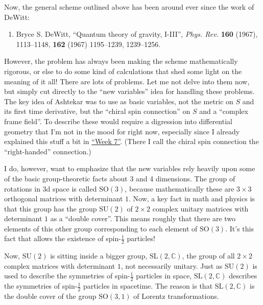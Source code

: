 \documentclass{article}
\def\tightlist{}
\begin{document}
Now, the general scheme outlined above has been around ever since the
work of DeWitt:

\begin{enumerate}
\def\labelenumi{\arabic{enumi})}
\tightlist
\item
  Bryce S. DeWitt, ``Quantum theory of gravity, I-III'', \emph{Phys.
  Rev.} \textbf{160} (1967), 1113--1148, \textbf{162} (1967) 1195--1239,
  1239--1256.
\end{enumerate}

However, the problem has always been making the scheme mathematically
rigorous, or else to do some kind of calculations that shed some light
on the meaning of it all! There are lots of problems. Let me not delve
into them now, but simply cut directly to the ``new variables'' idea for
handling these problems. The key idea of Ashtekar was to use as basic
variables, not the metric on \(S\) and its first time derivative, but
the ``chiral spin connection'' on \(S\) and a ``complex frame field''.
To describe these would require a digression into differential geometry
that I'm not in the mood for right now, especially since I already
explained this stuff a bit in \protect\hyperlink{week7}{``Week 7''}.
(There I call the chiral spin connection the ``right-handed''
connection.)

I do, however, want to emphasize that the new variables rely heavily
upon some of the basic group-theoretic facts about 3 and 4 dimensions.
The group of rotations in 3d space is called \(\mathrm{SO}(3)\), because
mathematically these are \(3\times3\) orthogonal matrices with
determinant \(1\). Now, a key fact in math and physics is that this
group has the group \(\mathrm{SU}(2)\) of \(2\times2\) complex unitary
matrices with determinant \(1\) as a ``double cover''. This means
roughly that there are two elements of this other group corresponding to
each element of \(\mathrm{SO}(3)\). It's this fact that allows the
existence of spin-\(\frac12\) particles!

Now, \(\mathrm{SU}(2)\) is sitting inside a bigger group,
\(\mathrm{SL}(2,\mathbb{C})\), the group of all \(2\times2\) complex
matrices with determinant \(1\), not necessarily unitary. Just as
\(\mathrm{SU}(2)\) is used to describe the symmetries of
spin-\(\frac12\) particles in space, \(\mathrm{SL}(2,\mathbb{C})\)
describes the symmetries of spin-\(\frac12\) particles in spacetime. The
reason is that \(\mathrm{SL}(2,\mathbb{C})\) is the double cover of the
group \(\mathrm{SO}(3,1)\) of Lorentz transformations.
\end{document}
